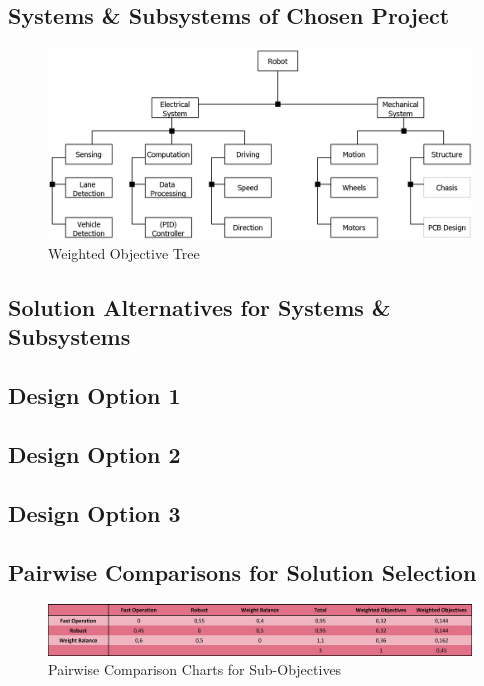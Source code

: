 \documentclass[a4paper,12pt]{article}
\begin{document}
	
	
	\subsection{Systems \& Subsystems of Chosen Project}	
	
	\begin{figure}[H]
		\centering
		\includegraphics[width=\textwidth,height=\textheight,keepaspectratio]{product-tree/product-tree} 
		\caption{\label{fig:product_tree}Weighted Objective Tree}
	\end{figure}

	\subsection{Solution Alternatives for Systems \& Subsystems }
	
	\subsection{Design Option 1}
	
	\subsection{Design Option 2}
	
	\subsection{Design Option 3}
	
	
	\subsection{Pairwise Comparisons for Solution Selection}	
	
	\begin{figure}[H]
		\centering
		\includegraphics[width=\textwidth,height=\textheight,keepaspectratio]{images/proje_objective_tree_2} 
		\caption{\label{fig:sub_project_objective_tree}Pairwise Comparison Charts for Sub-Objectives}
	\end{figure}	
	
\end{document}

